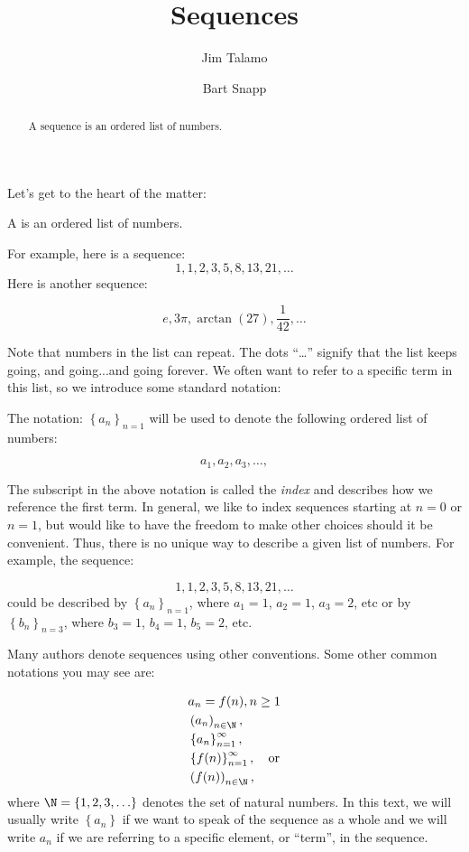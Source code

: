 \documentclass{ximera}
\author{Jim Talamo \and Bart Snapp}
\title[Dig-In:]{Sequences}
\begin{document}
\begin{abstract}
  A sequence is an ordered list of numbers.
\end{abstract}
\maketitle

Let's get to the heart of the matter:

\begin{definition}
  A  is an ordered list of numbers.
\end{definition}

For example, here is a sequence:
\[
1,1, 2, 3, 5, 8, 13, 21, \ldots
\]
Here is another sequence:

\[
e, 3\pi, \arctan(27), \frac{1}{42}, \ldots
\]


Note that numbers in the list can repeat.  The dots ``\ldots'' signify that the list keeps
going, and going...and going forever.  We often want to refer to a specific term in this list, so we introduce some standard notation:
\begin{definition} The notation:  $\left\{a_n\right\}_{n=1}$ will be used to denote the following ordered list of numbers:

\[
a_1, a_2,  a_3, \ldots,
\]
\end{definition}

The subscript in the above notation is called the \emph{index} and describes how we reference the first term.  In general, we like to index sequences starting at $n=0$ or $n=1$, but would like to have the freedom to make other choices should it be convenient.  Thus, there is no unique way to describe a given list of numbers.  For example, the sequence:

\[
1,1, 2, 3, 5, 8, 13, 21, \ldots
\]
could be described by $\left\{a_n\right\}_{n=1}$, where $a_1=1$, $a_2=1$, $a_3=2$, etc or by  $\left\{b_n\right\}_{n=3}$, where $b_3=1$, $b_4=1$, $b_5=2$, etc.

\begin{remark}
Many authors denote sequences using other conventions.  Some other common notations you may see are: 

\begin{align*}
  &a_n = f(n), n \geq 1   \\
  & \left(a_n\right)_{n \in \N}, \\
  & \left\{a_n\right\}_{n=1}^\infty, \\
  & \left\{f(n)\right\}_{n=1}^\infty, \quad \text{or} \\
  & \left(f(n)\right)_{n \in \N},
\end{align*}
where $\N = \{1,2,3, \ldots \}$ denotes the set of natural  numbers. In this text, we will usually write $\left\{a_n\right\}$ if we want to speak of the sequence as a whole and we will write $a_n$ if we are referring to a specific element, or ``term'', in the sequence.

\end{remark}
\end{document}
